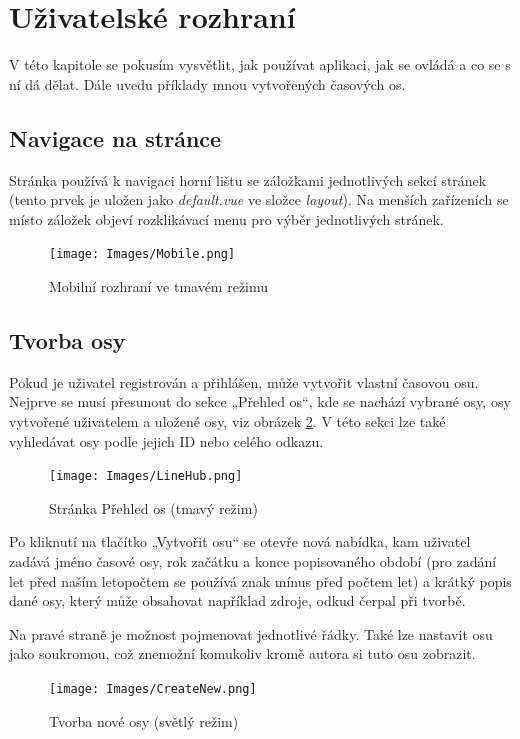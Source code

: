 \section{Uživatelské rozhraní}
V této kapitole se pokusím vysvětlit, jak používat aplikaci, jak se ovládá a co se s ní dá dělat. Dále uvedu příklady mnou vytvořených časových os. 

\subsection{Navigace na stránce}
Stránka používá k navigaci horní lištu se záložkami jednotlivých sekcí stránek (tento prvek je uložen jako \textit{default.vue} ve složce \textit{layout}). Na menších zařízeních se místo záložek objeví rozklikávací menu pro výběr jednotlivých stránek.

\begin{figure}[h]
    \centering
    \texttt{[image: Images/Mobile.png]}
    \caption{Mobilní rozhraní ve tmavém režimu}
    \label{fig:mobile}
\end{figure}

\subsection{Tvorba osy}
Pokud je uživatel registrován a přihlášen, může vytvořit vlastní časovou osu. Nejprve se musí přesunout do sekce „Přehled os“, kde se nachází vybrané osy, osy vytvořené uživatelem a uložené osy, viz obrázek \ref{fig:LineHub}. V této sekci lze také vyhledávat osy podle jejich ID nebo celého odkazu. 

\begin{figure}[h]
    \centering
    \texttt{[image: Images/LineHub.png]}
    \caption{Stránka Přehled os (tmavý režim)}
    \label{fig:LineHub}
\end{figure}

Po kliknutí na tlačítko „Vytvořit osu“ se otevře nová nabídka, kam uživatel zadává jméno časové osy, rok začátku a konce popisovaného období (pro zadání let před naším letopočtem se používá znak mínus před počtem let) a krátký popis dané osy, který může obsahovat například zdroje, odkud čerpal při tvorbě.

Na pravé straně je možnost pojmenovat jednotlivé řádky. Také lze nastavit osu jako soukromou, což znemožní komukoliv kromě autora si tuto osu zobrazit.

\begin{figure}[h]
    \centering
    \texttt{[image: Images/CreateNew.png]}
    \caption{Tvorba nové osy (světlý režim)}
    \label{fig:CreateNew}
\end{figure}

